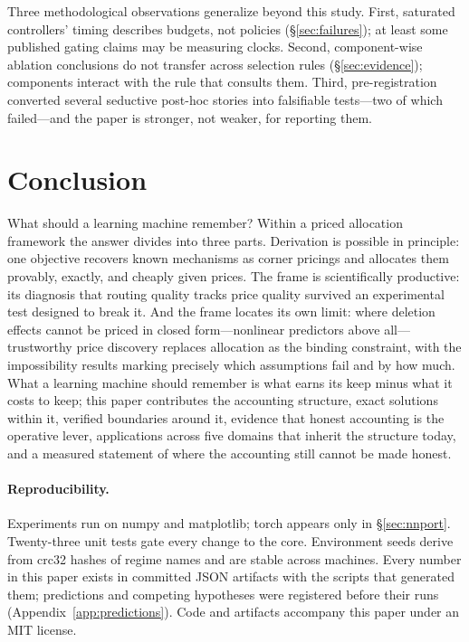 \documentclass[10pt,twocolumn]{article}
\theoremstyle{definition}
\begin{document}
Three methodological observations generalize beyond this study. First, saturated controllers' timing
describes budgets, not policies (\S\ref{sec:failures}); at least some published gating claims may be
measuring clocks. Second, component-wise ablation conclusions do not transfer across selection rules
(\S\ref{sec:evidence}); components interact with the rule that consults them. Third, pre-registration
converted several seductive post-hoc stories into falsifiable tests---two of which failed---and the paper is
stronger, not weaker, for reporting them.

\section{Conclusion}\label{sec:conclusion}

What should a learning machine remember? Within a priced allocation framework the answer divides into three
parts. Derivation is possible in principle: one objective recovers known mechanisms as corner pricings and
allocates them provably, exactly, and cheaply given prices. The frame is scientifically productive: its
diagnosis that routing quality tracks price quality survived an experimental test designed to break it. And
the frame locates its own limit: where deletion effects cannot be priced in closed form---nonlinear
predictors above all---trustworthy price discovery replaces allocation as the binding constraint, with the
impossibility results marking precisely which assumptions fail and by how much. What a learning machine
should remember is what earns its keep minus what it costs to keep; this paper contributes the accounting
structure, exact solutions within it, verified boundaries around it, evidence that honest accounting is the
operative lever, applications across five domains that inherit the structure today, and a measured statement
of where the accounting still cannot be made honest.

\paragraph{Reproducibility.}
Experiments run on numpy and matplotlib; torch appears only in \S\ref{sec:nnport}. Twenty-three unit tests
gate every change to the core. Environment seeds derive from crc32 hashes of regime names and are stable
across machines. Every number in this paper exists in committed {JSON} artifacts with the scripts that
generated them; predictions and competing hypotheses were registered before their runs
(Appendix~\ref{app:predictions}). Code and artifacts accompany this paper under an MIT license.
\end{document}
